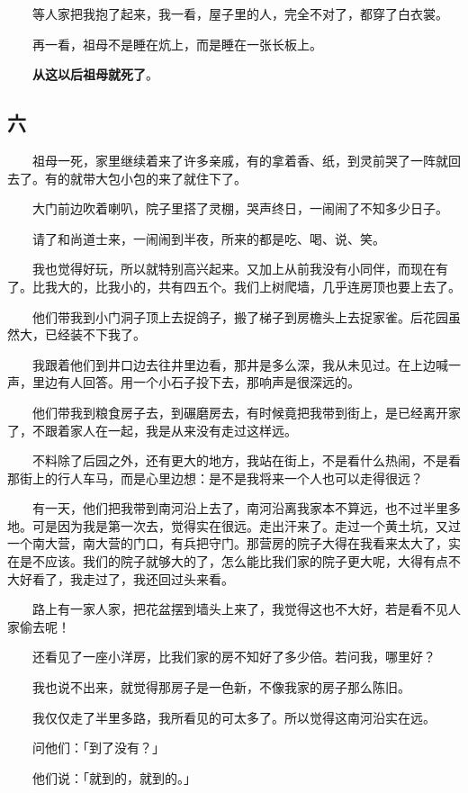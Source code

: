 \documentclass[UTF8]{ctexart}
\begin{document}
　　等人家把我抱了起来，我一看，屋子里的人，完全不对了，都穿了白衣裳。

　　再一看，祖母不是睡在炕上，而是睡在一张长板上。

　　\textbf{从这以后祖母就死了}。

\subsection{六}

　　祖母一死，家里继续着来了许多亲戚，有的拿着香、纸，到灵前哭了一阵就回去了。有的就带大包小包的来了就住下了。

　　大门前边吹着喇叭，院子里搭了灵棚，哭声终日，一闹闹了不知多少日子。

　　请了和尚道士来，一闹闹到半夜，所来的都是吃、喝、说、笑。

　　我也觉得好玩，所以就特别高兴起来。又加上从前我没有小同伴，而现在有了。比我大的，比我小的，共有四五个。我们上树爬墙，几乎连房顶也要上去了。

　　他们带我到小门洞子顶上去捉鸽子，搬了梯子到房檐头上去捉家雀。后花园虽然大，已经装不下我了。

　　我跟着他们到井口边去往井里边看，那井是多么深，我从未见过。在上边喊一声，里边有人回答。用一个小石子投下去，那响声是很深远的。

　　他们带我到粮食房子去，到碾磨房去，有时候竟把我带到街上，是已经离开家了，不跟着家人在一起，我是从来没有走过这样远。

　　不料除了后园之外，还有更大的地方，我站在街上，不是看什么热闹，不是看那街上的行人车马，而是心里边想：是不是我将来一个人也可以走得很远？

　　有一天，他们把我带到南河沿上去了，南河沿离我家本不算远，也不过半里多地。可是因为我是第一次去，觉得实在很远。走出汗来了。走过一个黄土坑，又过一个南大营，南大营的门口，有兵把守门。那营房的院子大得在我看来太大了，实在是不应该。我们的院子就够大的了，怎么能比我们家的院子更大呢，大得有点不大好看了，我走过了，我还回过头来看。

　　路上有一家人家，把花盆摆到墙头上来了，我觉得这也不大好，若是看不见人家偷去呢！

　　还看见了一座小洋房，比我们家的房不知好了多少倍。若问我，哪里好？

　　我也说不出来，就觉得那房子是一色新，不像我家的房子那么陈旧。

　　我仅仅走了半里多路，我所看见的可太多了。所以觉得这南河沿实在远。

　　问他们：「到了没有？」

　　他们说：「就到的，就到的。」
\end{document}
